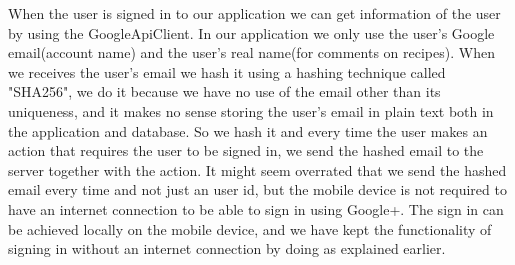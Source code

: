 When the user is signed in to our application we can get information of the user by using the GoogleApiClient.
In our application we only use the user's Google email(account name) and the user's real name(for comments on recipes). 
When we receives the user's email we hash it using a hashing technique called "SHA256", we do it because we have no use of the email other than its uniqueness, and it makes no sense storing the user's email in plain text both in the application and database. 
So we hash it and every time the user makes an action that requires the user to be signed in, we send the hashed email to the server together with the action. 
It might seem overrated that we send the hashed email every time and not just an user id, but the mobile device is not required to have an internet connection to be able to sign in using Google+. 
The sign in can be achieved locally on the mobile device, and we have kept the functionality of signing in without an internet connection by doing as explained earlier.



